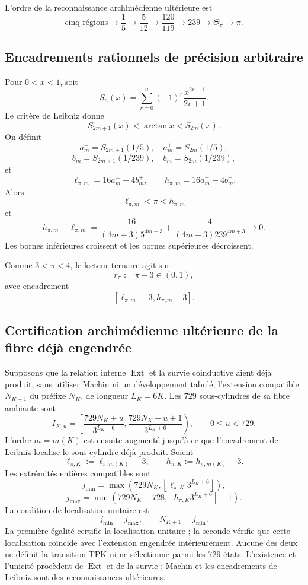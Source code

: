 L’ordre de la reconnaissance archimédienne ultérieure est
\[
 \text{cinq régions}
 \to\frac15
 \to\frac5{12}
 \to\frac{120}{119}
 \to239
 \to\Theta_\pi
 \to\pi.
\]

\subsection{Encadrements rationnels de précision arbitraire}

Pour \(0<x<1\), soit
\[
 S_n(x)=\sum_{r=0}^{n}(-1)^r\frac{x^{2r+1}}{2r+1}.
\]
Le critère de Leibniz donne
\[
 S_{2m+1}(x)<\arctan x<S_{2m}(x).
\]
On définit
\[
 a_m^-=S_{2m+1}(1/5),\quad a_m^+=S_{2m}(1/5),
\]
\[
 b_m^-=S_{2m+1}(1/239),\quad b_m^+=S_{2m}(1/239),
\]
et
\begin{equation}
 \ell_{\pi,m}=16a_m^- -4b_m^+,
 \qquad
 h_{\pi,m}=16a_m^+ -4b_m^-.
 \label{p12-83-c9-s1:eq:horquilla-pi-autonoma}
\end{equation}
Alors
\[
 \ell_{\pi,m}<\pi<h_{\pi,m}
\]
et
\begin{equation}
 h_{\pi,m}-\ell_{\pi,m}
 =
 \frac{16}{(4m+3)5^{4m+3}}
 +\frac{4}{(4m+3)239^{4m+3}}
 \longrightarrow0.
 \label{p12-83-c9-s1:eq:anchura-horquilla-pi}
\end{equation}
Les bornes inférieures croissent et les bornes supérieures décroissent.

Comme \(3<\pi<4\), le lecteur ternaire agit sur
\[
 r_\pi:=\pi-3\in(0,1),
\]
avec encadrement
\[
 [\ell_{\pi,m}-3,h_{\pi,m}-3].
\]

\subsection{Certification archimédienne ultérieure de la fibre déjà engendrée}

Supposons que la relation interne \(\operatorname{Ext}\) et la survie
coinductive aient déjà produit, sans utiliser Machin ni un développement tabulé,
l’extension compatible \(N_{K+1}\) du préfixe \(N_K\), de longueur
\(L_K=6K\). Les \(729\) sous-cylindres de sa fibre ambiante sont
\[
 I_{K,u}=
 \left[
 \frac{729N_K+u}{3^{L_K+6}},
 \frac{729N_K+u+1}{3^{L_K+6}}
 \right),
 \qquad0\leq u<729.
\]
L’ordre \(m=m(K)\) est ensuite augmenté jusqu’à ce que l’encadrement de Leibniz
localise le sous-cylindre déjà produit. Soient
\[
 \ell_{\pi,K}:=\ell_{\pi,m(K)}-3,
 \qquad
 h_{\pi,K}:=h_{\pi,m(K)}-3.
\]
Les extrémités entières compatibles sont
\[
 j_{\min}=
 \max\!\left(
 729N_K,\left\lfloor
 \ell_{\pi,K}3^{L_K+6}\right\rfloor
 \right),
\]
\[
 j_{\max}=
 \min\!\left(
 729N_K+728,\left\lceil
 h_{\pi,K}3^{L_K+6}\right\rceil-1
 \right).
\]
La condition de localisation unitaire est
\begin{equation}
 \boxed{j_{\min}=j_{\max},\qquad N_{K+1}=j_{\min}.}
 \label{p12-83-c9-s1:eq:seleccion-unitaria-subcilindro-pi}
\end{equation}
La première égalité certifie la localisation unitaire ; la seconde vérifie
que cette localisation coïncide avec l’extension engendrée intérieurement. Aucune
des deux ne définit la transition TPK ni ne sélectionne parmi les \(729\) états.
L’existence et l’unicité procèdent de \(\operatorname{Ext}\) et de la
survie ; Machin et les encadrements de Leibniz sont des reconnaissances
ultérieures.

